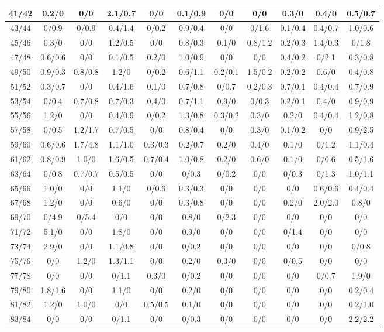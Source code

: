 \begin{table*}[htb]
\begin{tabular}{|c| c c c c c c c c c c |}
41/42&0.2/0& 0/0& 2.1/0.7& 0/0& 0.1/0.9& 0/0& 0/0& 0.3/0& 0.4/0& 0.5/0.7\\\hline
43/44&0/0.9& 0/0.9& 0.4/1.4& 0/0.2& 0.9/0.4& 0/0& 0/1.6& 0.1/0.4& 0.4/0.7& 1.0/0.6\\\hline
45/46&0.3/0& 0/0& 1.2/0.5& 0/0& 0.8/0.3& 0.1/0& 0.8/1.2& 0.2/0.3& 1.4/0.3& 0/1.8\\\hline
47/48&0.6/0.6& 0/0& 0.1/0.5& 0.2/0& 1.0/0.9& 0/0& 0/0& 0.4/0.2& 0/2.1& 0.3/0.8\\\hline
49/50&0.9/0.3& 0.8/0.8& 1.2/0& 0/0.2& 0.6/1.1& 0.2/0.1& 1.5/0.2& 0.2/0.2& 0.6/0& 0.4/0.8\\\hline
51/52&0.3/0.7& 0/0& 0.4/1.6& 0.1/0& 0.7/0.8& 0/0.7& 0.2/0.3& 0.7/0.1& 0.4/0.4& 0.7/0.9\\\hline
53/54&0/0.4& 0.7/0.8& 0.7/0.3& 0.4/0& 0.7/1.1& 0.9/0& 0/0.3& 0.2/0.1& 0.4/0& 0.9/0.9\\\hline
55/56&1.2/0& 0/0& 0.4/0.9& 0/0.2& 1.3/0.8& 0.3/0.2& 0.3/0& 0.2/0& 0.4/0.4& 1.2/0.8\\\hline
57/58&0/0.5& 1.2/1.7& 0.7/0.5& 0/0& 0.8/0.4& 0/0& 0.3/0& 0.1/0.2& 0/0& 0.9/2.5\\\hline
59/60&0.6/0.6& 1.7/4.8& 1.1/1.0& 0.3/0.3& 0.2/0.7& 0.2/0& 0.4/0& 0.1/0& 0/1.2& 1.1/0.4\\\hline
61/62&0.8/0.9& 1.0/0& 1.6/0.5& 0.7/0.4& 1.0/0.8& 0.2/0& 0.6/0& 0.1/0& 0/0.6& 0.5/1.6\\\hline
63/64&0/0.8& 0.7/0.7& 0.5/0.5& 0/0& 0/0.3& 0/0.2& 0/0& 0/0.3& 0/1.3& 1.0/1.1\\\hline
65/66&1.0/0& 0/0& 1.1/0& 0/0.6& 0.3/0.3& 0/0& 0/0& 0/0& 0.6/0.6& 0.4/0.4\\\hline
67/68&1.2/0& 0/0& 0.6/0& 0/0& 0.3/0.8& 0/0& 0/0& 0.2/0& 2.0/2.0& 0.8/0\\\hline
69/70&0/4.9& 0/5.4& 0/0& 0/0& 0.8/0& 0/2.3& 0/0& 0/0& 0/0& 0/0\\\hline
71/72&5.1/0& 0/0& 1.8/0& 0/0& 0.9/0& 0/0& 0/0& 0/1.4& 0/0& 0/0\\\hline
73/74&2.9/0& 0/0& 1.1/0.8& 0/0& 0/0.2& 0/0& 0/0& 0/0& 0/0& 0/0.8\\\hline
75/76&0/0& 1.2/0& 1.3/1.1& 0/0& 0.2/0& 0.3/0& 0/0& 0/0.5& 0/0& 0/0\\\hline
77/78&0/0& 0/0& 0/1.1& 0.3/0& 0/0.2& 0/0& 0/0& 0/0& 0/0.7& 1.9/0\\\hline
79/80&1.8/1.6& 0/0& 1.1/0& 0/0& 0.2/0& 0/0& 0/0& 0/0& 0/0& 0.2/0.4\\\hline
81/82&1.2/0& 1.0/0& 0/0& 0.5/0.5& 0.1/0& 0/0& 0/0& 0/0& 0/0& 0.2/1.0\\\hline
83/84&0/0& 0/0& 0/1.1& 0/0& 0/0.3& 0/0& 0/0& 0/0& 0/0& 2.2/2.2\\\hline

\end{tabular}
\end{table*}
